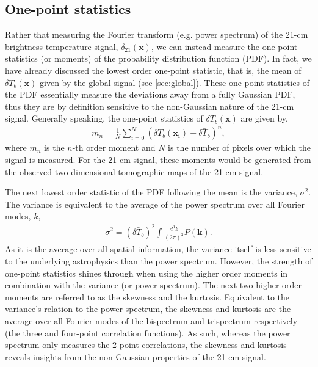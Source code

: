 \subsection{One-point statistics}

Rather that measuring the Fourier transform (e.g. power spectrum) of the 21-cm brightness temperature signal, $\delta_{21}(\mathbf{x})$, we can instead measure the one-point statistics (or moments) of the probability distribution function (PDF). In fact, we have already discussed the lowest order one-point statistic, that is, the mean of $\delta T_{b}(\mathbf{x})$ given by the global signal (see \ref{sec:global}).  These one-point statistics of the PDF essentially measure the deviations away from a fully Gaussian PDF, thus they are by definition sensitive to the non-Gaussian nature of the 21-cm signal. Generally speaking, the one-point statistics of $\delta T_{b}(\mathbf{x})$ are given by,
\begin{eqnarray}
m_{n} = \frac{1}{N}\sum^{N}_{i=0}(\delta T_{b}(\mathbf{x_{i}}) - \bar{\delta T_{b}})^{n},
\end{eqnarray}
where $m_{n}$ is the $n$-th order moment and $N$ is the number of pixels over which the signal is measured. For the 21-cm signal, these moments would be generated from the observed two-dimensional tomographic maps of the 21-cm signal.

The next lowest order statistic of the PDF following the mean is the variance, $\sigma^{2}$. The variance is equivalent to the average of the power spectrum over all Fourier modes, $k$,
\begin{eqnarray}
\sigma^{2} = (\bar{\delta T_{b}})^{2} \int \frac{d^{3}k}{(2\pi)^{3}} P(\mathbf{k}).
\end{eqnarray}
As it is the average over all spatial information, the variance itself is less sensitive to the underlying astrophysics than the power spectrum. However, the strength of one-point statistics shines through when using the higher order moments in combination with the variance (or power spectrum). The next two higher order moments are referred to as the skewness and the kurtosis. Equivalent to the variance's relation to the power spectrum, the skewness and kurtosis are the average over all Fourier modes of the bispectrum and trispectrum respectively (the three and four-point correlation functions). As such, whereas the power spectrum only measures the 2-point correlations, the skewness and kurtosis reveals insights from the non-Gaussian properties of the 21-cm signal.

